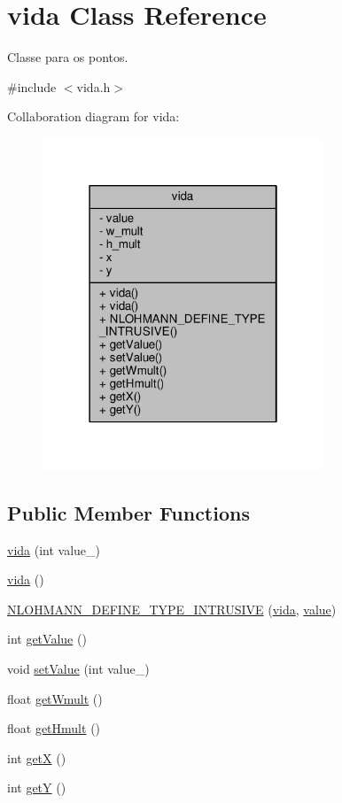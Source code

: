 \hypertarget{classvida}{}\section{vida Class Reference}
\label{classvida}


Classe para os pontos.  




{\ttfamily \#include $<$vida.\+h$>$}



Collaboration diagram for vida\+:
\nopagebreak
\begin{figure}[H]
\begin{center}
\leavevmode
\includegraphics[width=238pt]{classvida__coll__graph}
\end{center}
\end{figure}
\subsection*{Public Member Functions}
\begin{DoxyCompactItemize}
\item 
\hyperlink{classvida_ad384ba4be61ab721939ebd0a7ed818b8}{vida} (int value\+\_\+)
\item 
\hyperlink{classvida_abfe8a67f7f8dcae0ab10ec1c0db79fd5}{vida} ()
\item 
\hyperlink{classvida_a63b5fc83a742ff15aab32c8b898b23d3}{N\+L\+O\+H\+M\+A\+N\+N\+\_\+\+D\+E\+F\+I\+N\+E\+\_\+\+T\+Y\+P\+E\+\_\+\+I\+N\+T\+R\+U\+S\+I\+VE} (\hyperlink{classvida}{vida}, \hyperlink{classvida_ae9dec2f5055b4b7b7a67be0d3c344ba4}{value})
\item 
int \hyperlink{classvida_aff59d5fa0f254f27c938bf26d5ea69d1}{get\+Value} ()
\item 
void \hyperlink{classvida_a0aa2965112fb4a5cd4497a2fc4d01544}{set\+Value} (int value\+\_\+)
\item 
float \hyperlink{classvida_a7738e842c3b8d5f8efb9df3e924895d5}{get\+Wmult} ()
\item 
float \hyperlink{classvida_a790437d520f6b3b56cf3df3886e20e8e}{get\+Hmult} ()
\item 
int \hyperlink{classvida_a29ef7f71e790ec24dea4b62fda491567}{getX} ()
\item 
int \hyperlink{classvida_a79e81325d40ab1dff09631a95b800ffa}{getY} ()
\end{DoxyCompactItemize}
